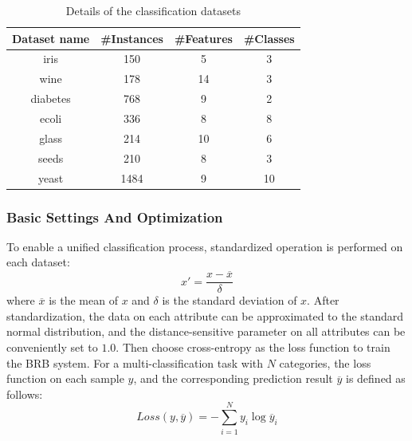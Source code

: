 \documentclass{ieeeaccess}
\begin{document}
\begin{table}
    \caption{Details of the classification datasets}
    \centering
    \normalsize
    \label{tab4}
    \begin{tabular}{cccc}
        \hline
        Dataset name & \#Instances & \#Features & \#Classes \\
        \hline
        iris         & 150         & 5          & 3         \\
        wine         & 178         & 14         & 3         \\
        diabetes     & 768         & 9          & 2         \\
        ecoli        & 336         & 8          & 8         \\
        glass        & 214         & 10         & 6         \\
        seeds        & 210         & 8          & 3         \\
        yeast        & 1484        & 9          & 10        \\
        \hline
    \end{tabular}
\end{table}



\subsubsection{Basic Settings And Optimization}
To enable a unified classification process,  standardized operation is performed on each dataset:
\begin{equation}
    x'=\frac{x-\overline{x}}{\delta}
\end{equation}
where $\overline{x}$ is the mean of $x$ and $\delta$ is the standard deviation of $x$.
After standardization, the data on each attribute can be approximated to the standard normal distribution,
and the distance-sensitive parameter on all attributes can be conveniently set to $1.0$.
Then choose cross-entropy as the loss function to train the BRB system.
For a multi-classification task with $N$ categories, the loss function on each sample $y$, and the corresponding prediction result $\overline{y}$ is defined as follows:
\begin{equation}
    Loss(y,\overline{y})=-\sum_{i=1}^Ny_{i}\log\overline{y}_i
\end{equation}
\end{document}
